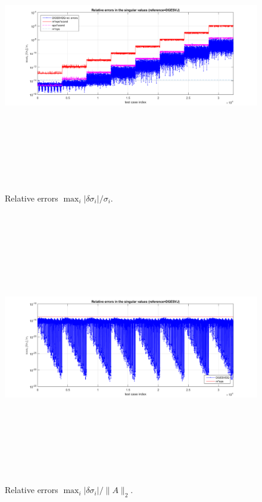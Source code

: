 \documentclass[12pt, a4paper, final]{article}
\numberwithin{equation}{section}
\begin{document}
\begin{figure}[h]
	\begin{center}
		\includegraphics[width=6.3in,height=4.7in]{Fig2.png}
	\end{center}	
	\caption{ \label{fig:2}  Relative errors $\max_i |\delta\sigma_i|/\sigma_i$.}
\end{figure}

\begin{figure}[h]
	\begin{center}
		\includegraphics[width=6.3in,height=4.7in]{Fig3.png}
	\end{center}	
	\caption{ \label{fig:3} Relative errors $\max_i |\delta\sigma_i|/\|A\|_2$.}
\end{figure} 
\end{document}
